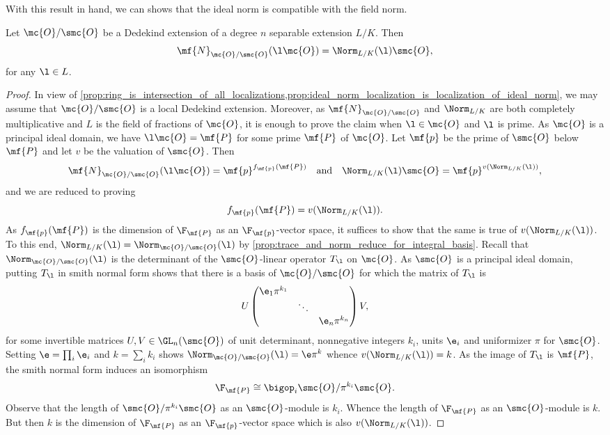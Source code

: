 \documentclass[12pt]{article}
\begin{document}
      With this result in hand, we can shows that the ideal norm is compatible with the field norm.

      \begin{proposition}\label{prop:ideal_norm_of_principal_ideal}
        Let \(\mc{O}/\smc{O}\) be a Dedekind extension of a degree \(n\) separable extension \(L/K\). Then
        \[
          \mf{N}_{\mc{O}/\smc{O}}(\l\mc{O}) = \Norm_{L/K}(\l)\smc{O},
        \]
        for any \(\l \in L\).
      \end{proposition}
      \begin{proof}
        In view of \cref{prop:ring_is_intersection_of_all_localizations,prop:ideal_norm_localization_is_localization_of_ideal_norm}, we may assume that \(\mc{O}/\smc{O}\) is a local Dedekind extension. Moreover, as \(\mf{N}_{\mc{O}/\smc{O}}\) and \(\Norm_{L/K}\) are both completely multiplicative and \(L\) is the field of fractions of \(\mc{O}\), it is enough to prove the claim when \(\l \in \mc{O}\) and \(\l\) is prime. As \(\mc{O}\) is a principal ideal domain, we have \(\l\mc{O} = \mf{P}\) for some prime \(\mf{P}\) of \(\mc{O}\). Let \(\mf{p}\) be the prime of \(\smc{O}\) below \(\mf{P}\) and let \(v\) be the valuation of \(\smc{O}\). Then
        \[
          \mf{N}_{\mc{O}/\smc{O}}(\l\mc{O}) = \mf{p}^{f_{\mf{p}}(\mf{P})} \quad \text{and} \quad \Norm_{L/K}(\l)\smc{O} = \mf{p}^{v(\Norm_{L/K}(\l))},
        \]
        and we are reduced to proving
        \[
          f_{\mf{p}}(\mf{P}) = v(\Norm_{L/K}(\l)).
        \]
        As \(f_{\mf{p}}(\mf{P})\) is the dimension of \(\F_{\mf{P}}\) as an \(\F_{\mf{p}}\)-vector space, it suffices to show that the same is true of \(v(\Norm_{L/K}(\l))\). To this end, \(\Norm_{L/K}(\l) = \Norm_{\mc{O}/\smc{O}}(\l)\) by \cref{prop:trace_and_norm_reduce_for_integral_basis}. Recall that \(\Norm_{\mc{O}/\smc{O}}(\l)\) is the determinant of the \(\smc{O}\)-linear operator \(T_{\l}\) on \(\mc{O}\). As \(\smc{O}\) is a principal ideal domain, putting \(T_{\l}\) in smith normal form shows that there is a basis of \(\mc{O}/\smc{O}\) for which the matrix of \(T_{\l}\) is
        \[
          U\begin{pmatrix} \e_{1}\pi^{k_{1}} & & \\ & \ddots & \\ & & \e_{n}\pi^{k_{n}} \end{pmatrix}V,
        \]
        for some invertible matrices \(U,V \in \GL_{n}(\smc{O})\) of unit determinant, nonnegative integers \(k_{i}\), units \(\e_{i}\) and uniformizer \(\pi\) for \(\smc{O}\). Setting \(\e = \prod_{i}\e_{i}\) and \(k = \sum_{i}k_{i}\) shows \(\Norm_{\mc{O}/\smc{O}}(\l) =\e\pi^{k}\) whence \(v(\Norm_{L/K}(\l)) = k\). As the image of \(T_{\l}\) is \(\mf{P}\), the smith normal form induces an isomorphism
        \[
          \F_{\mf{P}} \cong \bigop_{i}\smc{O}/\pi^{k_{i}}\smc{O}.
        \]
        Observe that the length of \(\smc{O}/\pi^{k_{i}}\smc{O}\) as an \(\smc{O}\)-module is \(k_{i}\). Whence the length of \(\F_{\mf{P}}\) as an \(\smc{O}\)-module is \(k\). But then \(k\) is the dimension of \(\F_{\mf{P}}\) as an \(\F_{\mf{p}}\)-vector space which is also \(v(\Norm_{L/K}(\l))\).
      \end{proof}
\end{document}
